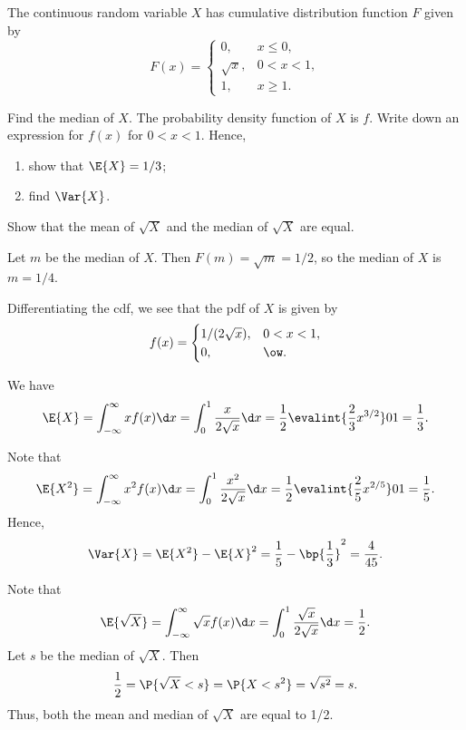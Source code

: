 \begin{problem}
    The continuous random variable $X$ has cumulative distribution function $F$ given by \[F(x) = \begin{cases}
        0, & x \leq 0,\\
        \sqrt{x}, & 0 < x < 1, \\
        1, & x \geq 1.
    \end{cases}\]

    Find the median of $X$. The probability density function of $X$ is $f$. Write down an expression for $f(x)$ for $0 < x < 1$. Hence,
    \begin{enumerate}
        \item show that $\E{X} = 1/3$;
        \item find $\Var{X}$.
    \end{enumerate}

    Show that the mean of $\sqrt{X}$ and the median of $\sqrt{X}$ are equal.
\end{problem}
\begin{solution}
    Let $m$ be the median of $X$. Then $F(m) = \sqrt{m} = 1/2$, so the median of $X$ is $m = 1/4$.

    Differentiating the cdf, we see that the pdf of $X$ is given by \[f(x) = \begin{cases}
        1/(2\sqrt{x}), & 0 < x < 1,\\
        0, & \ow.
    \end{cases}\]
    
    \begin{ppart}
        We have \[\E{X} = \int_{-\infty}^{\infty} x f(x) \d x = \int_0^1 \frac{x}{2\sqrt{x}} \d x = \frac12 \evalint{\frac23 x^{3/2}}01 = \frac13.\]
    \end{ppart}
    \begin{ppart}
        Note that \[\E{X^2} = \int_{-\infty}^{\infty} x^2 f(x) \d x = \int_0^1 \frac{x^2}{2\sqrt{x}} \d x = \frac12 \evalint{\frac25 x^{2/5}}01 = \frac15.\] Hence, \[\Var{X} = \E{X^2} - \E{X}^2 = \frac15 - \bp{\frac13}^2 = \frac4{45}.\]
    \end{ppart}

    Note that \[\E{\sqrt{X}} = \int_{-\infty}^{\infty} \sqrt{x} f(x) \d x = \int_0^1 \frac{\sqrt{x}}{2\sqrt{x}} \d x = \frac12.\] Let $s$ be the median of $\sqrt{X}$. Then \[\frac12 = \P{\sqrt{X} < s} = \P{X < s^2} = \sqrt{s^2} = s.\] Thus, both the mean and median of $\sqrt{X}$ are equal to 1/2.
\end{solution}


